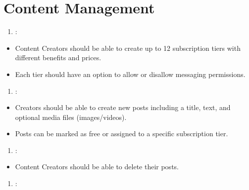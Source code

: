 \documentclass[letterpaper,10pt,english]{sphinxmanual}
\begin{document}
\section{Content Management}
\label{\detokenize{modules/requirements:content-management}}\begin{enumerate}
%
\setcounter{enumi}{4}
\item {} 
\sphinxAtStartPar
{}:

\end{enumerate}
\begin{itemize}
\item {} 
\sphinxAtStartPar
Content Creators should be able to create up to 12 subscription tiers with different benefits and prices.

\item {} 
\sphinxAtStartPar
Each tier should have an option to allow or disallow messaging permissions.

\end{itemize}
\begin{enumerate}
%
\setcounter{enumi}{5}
\item {} 
\sphinxAtStartPar
{}:

\end{enumerate}
\begin{itemize}
\item {} 
\sphinxAtStartPar
Creators should be able to create new posts including a title, text, and optional media files (images/videos).

\item {} 
\sphinxAtStartPar
Posts can be marked as free or assigned to a specific subscription tier.

\end{itemize}
\begin{enumerate}
%
\setcounter{enumi}{6}
\item {} 
\sphinxAtStartPar
{}:

\end{enumerate}
\begin{itemize}
\item {} 
\sphinxAtStartPar
Content Creators should be able to delete their posts.

\end{itemize}
\begin{enumerate}
%
\setcounter{enumi}{7}
\item {} 
\sphinxAtStartPar
{}:

\end{enumerate}
\end{document}
